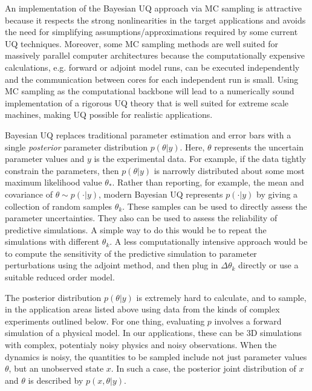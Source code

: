 \documentclass[11pt]{article}
\newcommand{\MarginPar}[1]{\marginpar{%
\vskip-\baselineskip %
\raggedright\tiny\sffamily
\hrule\smallskip{\color{red}#1}\par\smallskip\hrule}}
\begin{document}
An implementation of the Bayesian UQ approach via MC sampling
is attractive because it respects the strong nonlinearities in the target applications
and avoids the need for simplifying assumptions/approximations required by some current UQ techniques.
Moreover, some MC sampling methods are well suited for massively parallel computer
architectures because the computationally expensive calculations,
e.g. forward or adjoint model runs, can be executed independently and
the communication between cores for each independent run is small.
Using MC sampling as the computational backbone will lead to a numerically sound
implementation of a rigorous UQ theory that is well suited for extreme scale machines, making UQ possible for realistic applications.

Bayesian UQ replaces traditional parameter estimation and error bars with a single {\em posterior}
parameter distribution $p(\theta|y)$. 
Here, $\theta$ represents the uncertain parameter values and $y$ is the experimental data.
For example, if the data tightly constrain the parameters, then $p(\theta|y)$ is narrowly 
distributed about some most maximum likelihood value $\theta_*$.
Rather than reporting, for example, the mean and covariance of $\theta \sim p(\cdot|y)$,
modern Bayesian UQ represents $p(\cdot|y)$ by giving a collection of random samples $\theta_k$.
These samples can be used to directly assess the parameter uncertainties.
They also can be used to assess the reliability of predictive simulations.
A simple way to do this would be to repeat the simulations with different $\theta_k$.
A less computationally intensive approach would be to compute the sensitivity of the predictive 
simulation to parameter perturbations using the adjoint method, and then plug in $\Delta \theta_k$
directly or use a suitable reduced order model.

The posterior distribution $p(\theta|y)$ is extremely hard to calculate, and to sample, in the 
application areas listed above using data from the kinds of complex experiments outlined below.
For one thing, evaluating $p$ involves a forward simulation of a physical model.
\MarginPar{JBB:  Don't like forware references}
In our applications, these can be 3D simulations with complex, potentialy noisy physics and noisy observations.
When the dynamics is noisy, the quantities to be sampled include not just parameter values $\theta$,
but an unobserved state $x$.
In such a case, the posterior joint distribution of $x$ and $\theta$ is described by $p(x,\theta|y)$.
\end{document}
